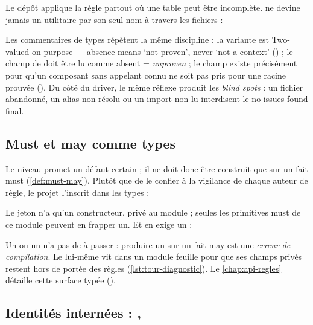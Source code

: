 Le dépôt applique la règle partout où une table peut être incomplète.  ne devine jamais un utilitaire par son seul nom à travers les fichiers :


Les commentaires de types répètent la même discipline : la variante  est \og Two-valued on purpose --- absence means `not proven', never `not a context'\fg{} () ; le champ  de  doit être lu comme \og absent = \emph{unproven}\fg{} ; le champ  existe précisément pour qu'un composant sans appelant connu ne soit pas pris pour une racine prouvée (). Du côté du driver, le même réflexe produit les \emph{blind spots} : un fichier abandonné, un alias non résolu ou un import non lu interdisent le \og no issues found\fg{} final.

\subsection{Must et may comme types}

Le niveau \Error{} promet un défaut certain ; il ne doit donc être construit que sur un fait must (\cref{def:must-may}). Plutôt que de le confier à la vigilance de chaque auteur de règle, le projet l'inscrit dans les types :


Le jeton  n'a qu'un constructeur, privé au module  ; seules les primitives must de ce module peuvent en frapper un. Et  en exige un :


Un  ou un  n'a pas de  à passer : produire un \Error{} sur un fait may est une \emph{erreur de compilation}. Le  lui-même vit dans un module feuille pour que ses champs privés restent hors de portée des règles (\cref{lst:tour-diagnostic}). Le \cref{chap:api-regles} détaille cette surface typée ().

\subsection{Identités internées : , }

